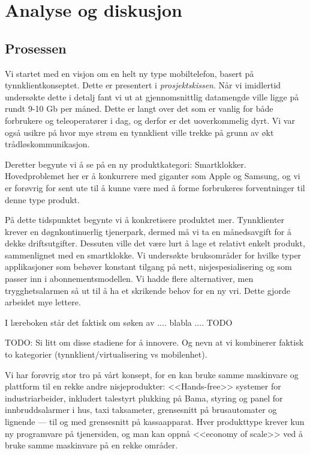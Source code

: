 \chapter{Analyse og diskusjon}

\section{Prosessen}
\label{prosessen}

Vi startet med en visjon om en helt ny type mobiltelefon, basert på
tynnklientkonseptet. Dette er presentert i \textit{prosjektskissen}. Når vi
imidlertid undersøkte dette i detalj fant vi ut at gjennomsnittlig datamengde
ville ligge på rundt 9-10 Gb per måned. Dette er langt over det som er vanlig
for både forbrukere og teleoperatører i dag, og derfor er det uoverkommelig
dyrt. Vi var også usikre på hvor mye strøm en tynnklient ville trekke på grunn
av økt trådløskommunikasjon.

Deretter begynte vi å se på en ny produktkategori: Smartklokker. Hovedproblemet
her er å konkurrere med giganter som Apple og Samsung, og vi er forøvrig for
sent ute til å kunne være med å forme forbrukeres forventninger til denne type
produkt.

På dette tidspunktet begynte vi å konkretisere produktet mer. Tynnklienter
krever en døgnkontinuerlig tjenerpark, dermed må vi ta en månedsavgift for å
dekke driftsutgifter. Dessuten ville det være lurt å lage et relativt enkelt
produkt, sammenlignet med en smartklokke. Vi undersøkte bruksområder for hvilke
typer applikasjoner som behøver konstant tilgang på nett, nisjespesialisering og som passer inn i
abonnementsmodellen. Vi hadde flere alternativer, men trygghetsalarmen så ut
til å ha et skrikende behov for en ny vri. Dette gjorde arbeidet mye lettere.

I læreboken står det faktisk om søken av .... blabla .... TODO

TODO: Si litt om disse stadiene for å innovere. Og nevn at vi kombinerer
faktisk to kategorier (tynnklient/virtualisering vs mobilenhet).

Vi har forøvrig stor tro på vårt konsept, for en kan bruke samme maskinvare og
plattform til en rekke andre nisjeprodukter: <<Hands-free>> systemer for
industriarbeider, inkludert talestyrt plukking på Bama, styring og panel for
innbruddsalarmer i hus, taxi taksameter, grensesnitt på brusautomater og
lignende --- til og med grensesnitt på kassaapparat.  Hver produkttype krever
kun ny programvare på tjenersiden, og man kan oppnå <<economy of scale>> ved å
bruke samme maskinvare på en rekke områder.

